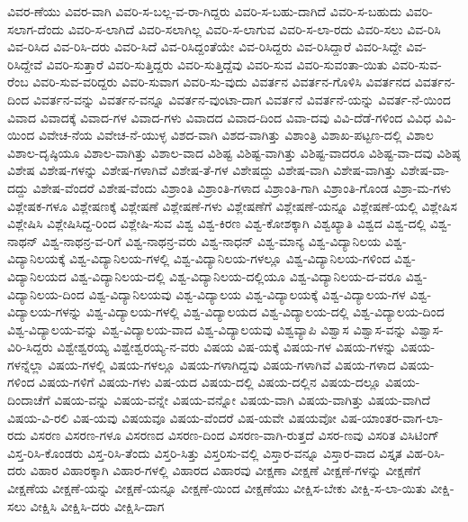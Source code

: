 {ವಿವರ-ಣೆಯು
ವಿವರ-ವಾಗಿ
ವಿವರಿ-ಸ-ಬಲ್ಲ-ವ-ರಾ-ಗಿದ್ದರು
ವಿವರಿ-ಸ-ಬಹು-ದಾಗಿದೆ
ವಿವರಿ-ಸ-ಬಹುದು
ವಿವರಿ-ಸಲಾಗ-ದೆಂದು
ವಿವರಿ-ಸ-ಲಾಗಿದೆ
ವಿವರಿ-ಸಲಾಗಿಲ್ಲ
ವಿವರಿ-ಸ-ಲಾಗುವ
ವಿವರಿ-ಸ-ಲಾ-ರದು
ವಿವರಿ-ಸಲು
ವಿವ-ರಿಸಿ
ವಿವ-ರಿಸಿದ
ವಿವ-ರಿಸಿ-ದರು
ವಿವರಿ-ಸಿದೆ
ವಿವ-ರಿಸಿದ್ದಂತೆಯೇ
ವಿವ-ರಿಸಿದ್ದರು
ವಿವ-ರಿಸಿದ್ದಾರೆ
ವಿವರಿ-ಸಿದ್ದೇ
ವಿವ-ರಿಸಿದ್ದೇವೆ
ವಿವರಿ-ಸುತ್ತಾರೆ
ವಿವರಿ-ಸುತ್ತಿದ್ದರು
ವಿವರಿ-ಸುತ್ತಿದ್ದೆವು
ವಿವರಿ-ಸುವ
ವಿವರಿ-ಸುವಂತಾ-ಯಿತು
ವಿವರಿ-ಸುವ-ರೆಂಬ
ವಿವರಿ-ಸುವ-ವರಿದ್ದರು
ವಿವರಿ-ಸುವಾಗ
ವಿವರಿ-ಸು-ವುದು
ವಿವರ್ತನ
ವಿವರ್ತನ-ಗೊಳಿಸಿ
ವಿವರ್ತನದ
ವಿವರ್ತನ-ದಿಂದ
ವಿವರ್ತನ-ವನ್ನು
ವಿವರ್ತನ-ವನ್ನೂ
ವಿವರ್ತನ-ವುಂಟಾ-ದಾಗ
ವಿವರ್ತನೆ
ವಿವರ್ತನೆ-ಯನ್ನು
ವಿವರ್ತ-ನೆ-ಯಿಂದ
ವಿವಾದ
ವಿವಾದಕ್ಕೆ
ವಿವಾದ-ಗಳ
ವಿವಾದ-ಗಳು
ವಿವಾದದ
ವಿವಾದ-ದಿಂದ
ವಿವಾ-ದವು
ವಿವಿ-ದೆಡೆ-ಗಳಿಂದ
ವಿವಿಧ
ವಿವಿ-ಯಿಂದ
ವಿವೇಚ-ನೆಯ
ವಿವೇಚ-ನೆ-ಯುಳ್ಳ
ವಿಶದ-ವಾಗಿ
ವಿಶದ-ವಾಗಿತ್ತು
ವಿಶಾಂತ್ರಿ
ವಿಶಾಖ-ಪಟ್ಟಣ-ದಲ್ಲಿ
ವಿಶಾಲ
ವಿಶಾಲ-ದೃಷ್ಠಿಯೂ
ವಿಶಾಲ-ವಾಗಿತ್ತು
ವಿಶಾಲ-ವಾದ
ವಿಶಿಷ್ಟ
ವಿಶಿಷ್ಟ-ವಾಗಿತ್ತು
ವಿಶಿಷ್ಟ-ವಾದರೂ
ವಿಶಿಷ್ಟ-ವಾ-ದವು
ವಿಶಿಷ್ಠ
ವಿಶೇಷ
ವಿಶೇಷ-ಗಳನ್ನು
ವಿಶೇಷ-ಗಳಾಗಿವೆ
ವಿಶೇಷ-ತೆ-ಗಳ
ವಿಶೇಷದ್ದು
ವಿಶೇಷ-ವಾಗಿ
ವಿಶೇಷ-ವಾಗಿತ್ತು
ವಿಶೇಷ-ವಾ-ದದ್ದು
ವಿಶೇಷ-ವೆಂದರೆ
ವಿಶೇಷ-ವೆಂದು
ವಿಶ್ರಾಂತಿ
ವಿಶ್ರಾಂತಿ-ಗಳಾದ
ವಿಶ್ರಾಂತಿ-ಗಾಗಿ
ವಿಶ್ರಾಂತಿ-ಗೊಂಡ
ವಿಶ್ರಾ-ಮ-ಗಳು
ವಿಶ್ಲೇಷಕ-ಗಳೂ
ವಿಶ್ಲೇಷಣಕ್ಕೆ
ವಿಶ್ಲೇಷಣೆ
ವಿಶ್ಲೇಷಣೆ-ಗಳು
ವಿಶ್ಲೇಷಣೆಗೆ
ವಿಶ್ಲೇಷಣೆ-ಯನ್ನೂ
ವಿಶ್ಲೇಷಣೆ-ಯಲ್ಲಿ
ವಿಶ್ಲೇಷಿಸ
ವಿಶ್ಲೇಷಿಸಿ
ವಿಶ್ಲೇಷಿಸಿದ್ದ-ರಿಂದ
ವಿಶ್ಲೇಷಿ-ಸುವ
ವಿಶ್ವ
ವಿಶ್ವ-ಕಿರಣ
ವಿಶ್ವ-ಕೋಶಕ್ಕಾಗಿ
ವಿಶ್ವಖ್ಯಾತಿ
ವಿಶ್ವದ
ವಿಶ್ವ-ದಲ್ಲಿ
ವಿಶ್ವ-ನಾಥನ್
ವಿಶ್ವ-ನಾಥನ್ರ-ವ-ರಿಗೆ
ವಿಶ್ವ-ನಾಥನ್ರ-ವರು
ವಿಶ್ವ-ನಾಧನ್
ವಿಶ್ವ-ಮಾನ್ಯ
ವಿಶ್ವ-ವಿದ್ಯಾನಿಲಯ
ವಿಶ್ವ-ವಿದ್ಯಾನಿಲಯಕ್ಕೆ
ವಿಶ್ವ-ವಿದ್ಯಾನಿಲಯ-ಗಳಲ್ಲಿ
ವಿಶ್ವ-ವಿದ್ಯಾನಿಲಯ-ಗಳಲ್ಲೂ
ವಿಶ್ವ-ವಿದ್ಯಾನಿಲಯ-ಗಳಿಂದ
ವಿಶ್ವ-ವಿದ್ಯಾನಿಲಯದ
ವಿಶ್ವ-ವಿದ್ಯಾನಿಲಯ-ದಲ್ಲಿ
ವಿಶ್ವ-ವಿದ್ಯಾನಿಲಯ-ದಲ್ಲಿಯೂ
ವಿಶ್ವ-ವಿದ್ಯಾನಿಲಯ-ದ-ವರೂ
ವಿಶ್ವ-ವಿದ್ಯಾನಿಲಯ-ದಿಂದ
ವಿಶ್ವ-ವಿದ್ಯಾನಿಲಯವು
ವಿಶ್ವ-ವಿದ್ಯಾಲಯ
ವಿಶ್ವ-ವಿದ್ಯಾಲಯಕ್ಕೆ
ವಿಶ್ವ-ವಿದ್ಯಾಲಯ-ಗಳ
ವಿಶ್ವ-ವಿದ್ಯಾಲಯ-ಗಳನ್ನು
ವಿಶ್ವ-ವಿದ್ಯಾಲಯ-ಗಳಲ್ಲಿ
ವಿಶ್ವ-ವಿದ್ಯಾಲಯದ
ವಿಶ್ವ-ವಿದ್ಯಾಲಯ-ದಲ್ಲಿ
ವಿಶ್ವ-ವಿದ್ಯಾಲಯ-ದಿಂದ
ವಿಶ್ವ-ವಿದ್ಯಾಲಯ-ವನ್ನು
ವಿಶ್ವ-ವಿದ್ಯಾಲಯ-ವಾದ
ವಿಶ್ವ-ವಿದ್ಯಾಲಯವು
ವಿಶ್ವವ್ಯಾಪಿ
ವಿಶ್ವಾಸ
ವಿಶ್ವಾಸ-ವನ್ನು
ವಿಶ್ವಾಸ-ವಿರಿ-ಸಿದ್ದರು
ವಿಶ್ವೇಶ್ವರಯ್ಯ
ವಿಶ್ವೇಶ್ವರಯ್ಯ-ನ-ವರು
ವಿಷಯ
ವಿಷ-ಯಕ್ಕೆ
ವಿಷಯ-ಗಳ
ವಿಷಯ-ಗಳನ್ನು
ವಿಷಯ-ಗಳನ್ನೆಲ್ಲಾ
ವಿಷಯ-ಗಳಲ್ಲಿ
ವಿಷಯ-ಗಳಲ್ಲೂ
ವಿಷಯ-ಗಳಾಗಿದ್ದವು
ವಿಷಯ-ಗಳಾಗಿವೆ
ವಿಷಯ-ಗಳಾದ
ವಿಷಯ-ಗಳಿಂದ
ವಿಷಯ-ಗಳಿಗೆ
ವಿಷಯ-ಗಳು
ವಿಷ-ಯದ
ವಿಷಯ-ದಲ್ಲಿ
ವಿಷಯ-ದಲ್ಲಿನ
ವಿಷಯ-ದಲ್ಲೂ
ವಿಷಯ-ದಿಂದಾಚೆಗೆ
ವಿಷಯ-ವನ್ನು
ವಿಷಯ-ವನ್ನೇ
ವಿಷಯ-ವನ್ನೋ
ವಿಷಯ-ವಾಗಿ
ವಿಷಯ-ವಾಗಿತ್ತು
ವಿಷಯ-ವಾಗಿದೆ
ವಿಷಯ-ವಿ-ರಲಿ
ವಿಷ-ಯವು
ವಿಷಯವೂ
ವಿಷಯ-ವೆಂದರೆ
ವಿಷ-ಯವೇ
ವಿಷಯವೋ
ವಿಷ-ಯಾಂತರ-ವಾಗ-ಲಾ-ರದು
ವಿಸರಣ
ವಿಸರಣ-ಗಳೂ
ವಿಸರಣದ
ವಿಸರಣ-ದಿಂದ
ವಿಸರಣ-ವಾಗಿ-ರುತ್ತದೆ
ವಿಸರ-ಣವು
ವಿಸರಿತ
ವಿಸಿಟಿಂಗ್
ವಿಸ್ತ-ರಿಸಿ-ಕೊಂಡರು
ವಿಸ್ತ-ರಿಸಿ-ತೆಂದು
ವಿಸ್ತರಿ-ಸಿತ್ತು
ವಿಸ್ತರಿಸು-ವಲ್ಲಿ
ವಿಸ್ತಾರ-ವನ್ನೂ
ವಿಸ್ತಾರ-ವಾದ
ವಿಸ್ತೃತ
ವಿಹ-ರಿಸಿ-ದರು
ವಿಹಾರ
ವಿಹಾರಕ್ಕಾಗಿ
ವಿಹಾರ-ಗಳಲ್ಲಿ
ವಿಹಾರದ
ವಿಹಾರವು
ವೀಕ್ಷಣಾ
ವೀಕ್ಷಣೆ
ವೀಕ್ಷಣೆ-ಗಳನ್ನು
ವೀಕ್ಷಣೆಗೆ
ವೀಕ್ಷಣೆಯ
ವೀಕ್ಷಣೆ-ಯನ್ನು
ವೀಕ್ಷಣೆ-ಯನ್ನೂ
ವೀಕ್ಷಣೆ-ಯಿಂದ
ವೀಕ್ಷಣೆಯು
ವೀಕ್ಷಿಸ-ಬೇಕು
ವೀಕ್ಷಿ-ಸ-ಲಾ-ಯಿತು
ವೀಕ್ಷಿ-ಸಲು
ವೀಕ್ಷಿಸಿ
ವೀಕ್ಷಿಸಿ-ದರು
ವೀಕ್ಷಿಸಿ-ದಾಗ
}
